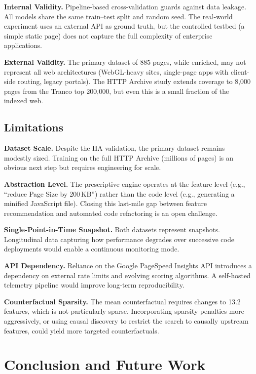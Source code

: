 \documentclass[sn-nature]{sn-jnl}
\begin{document}
\textbf{Internal Validity.} Pipeline-based cross-validation guards against data leakage. All models share the same train--test split and random seed. The real-world experiment uses an external API as ground truth, but the controlled testbed (a simple static page) does not capture the full complexity of enterprise applications.

\textbf{External Validity.} The primary dataset of 885 pages, while enriched, may not represent all web architectures (WebGL-heavy sites, single-page apps with client-side routing, legacy portals). The HTTP Archive study extends coverage to 8,000 pages from the Tranco top 200,000, but even this is a small fraction of the indexed web.

\subsection{Limitations}

\textbf{Dataset Scale.} Despite the HA validation, the primary dataset remains modestly sized. Training on the full HTTP Archive (millions of pages) is an obvious next step but requires engineering for scale.

\textbf{Abstraction Level.} The prescriptive engine operates at the feature level (e.g., ``reduce Page Size by 200\,KB'') rather than the code level (e.g., generating a minified JavaScript file). Closing this last-mile gap between feature recommendation and automated code refactoring is an open challenge.

\textbf{Single-Point-in-Time Snapshot.} Both datasets represent snapshots. Longitudinal data capturing how performance degrades over successive code deployments would enable a continuous monitoring mode.

\textbf{API Dependency.} Reliance on the Google PageSpeed Insights API introduces a dependency on external rate limits and evolving scoring algorithms. A self-hosted telemetry pipeline would improve long-term reproducibility.

\textbf{Counterfactual Sparsity.} The mean counterfactual requires changes to 13.2 features, which is not particularly sparse. Incorporating sparsity penalties more aggressively, or using causal discovery to restrict the search to causally upstream features, could yield more targeted counterfactuals.


\section{Conclusion and Future Work}\label{sec8}
\end{document}
